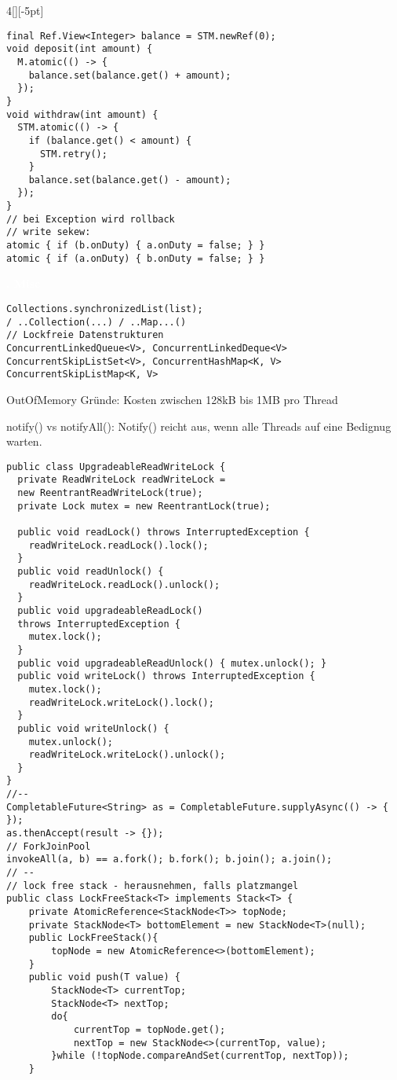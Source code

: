 \documentclass[%
	pdftex,%
	a4paper,%
	landscape,%
	ngerman,
	oneside,%
	6pt,%
	halfparskip,%
]{scrbook}
\newenvironment{mainbox}{%
  \def\FrameCommand{\fboxrule 1px \fcolorbox{black}{spec_blue}}%
  \MakeFramed {\advance\hsize-\width \FrameRestore}}%
 {\endMakeFramed}
\newcommand{\maintopic}[1]{\setcounter{subtopicenum}{0}\setcounter{subsubtopicenum}{0}\vspace{-4px}\begin{mainbox}\textcolor{white}{\textbf{\large{\stepcounter{maintopicenum}\Roman{maintopicenum}. #1}}}\end{mainbox}\vspace{-4px}}
\newenvironment{tight-itemize}
{ \begin{itemize}[leftmargin=*, nosep]
    \setlength{\itemsep}{0px}
    \setlength{\parskip}{0px}
    \setlength{\parsep}{0px}  }
{ \end{itemize}                  }
\begin{document}
\begin{multicols}{4}[][-5pt]
\begin{lstlisting}
final Ref.View<Integer> balance = STM.newRef(0);
void deposit(int amount) {
  M.atomic(() -> {
    balance.set(balance.get() + amount);
  });
}
void withdraw(int amount) {
  STM.atomic(() -> {
    if (balance.get() < amount) {
      STM.retry();
    }
    balance.set(balance.get() - amount);
  });
}
// bei Exception wird rollback
// write sekew:
atomic { if (b.onDuty) { a.onDuty = false; } }
atomic { if (a.onDuty) { b.onDuty = false; } }
\end{lstlisting}

\maintopic{Misc}
\begin{lstlisting}
Collections.synchronizedList(list); 
/ ..Collection(...) / ..Map...()
// Lockfreie Datenstrukturen
ConcurrentLinkedQueue<V>, ConcurrentLinkedDeque<V>
ConcurrentSkipListSet<V>, ConcurrentHashMap<K, V>
ConcurrentSkipListMap<K, V>
\end{lstlisting}

\begin{tight-itemize}
    \item{OutOfMemory Gründe: Kosten zwischen 128kB bis 1MB pro Thread}
    \item{notify() vs notifyAll(): Notify() reicht aus, wenn alle Threads auf eine Bedignug warten.}
\end{tight-itemize}

\begin{lstlisting}
public class UpgradeableReadWriteLock {
  private ReadWriteLock readWriteLock = 
  new ReentrantReadWriteLock(true);
  private Lock mutex = new ReentrantLock(true);

  public void readLock() throws InterruptedException {
    readWriteLock.readLock().lock();
  }
  public void readUnlock() {
    readWriteLock.readLock().unlock();
  }
  public void upgradeableReadLock() 
  throws InterruptedException {
    mutex.lock();
  }
  public void upgradeableReadUnlock() { mutex.unlock(); }
  public void writeLock() throws InterruptedException {
    mutex.lock();
    readWriteLock.writeLock().lock();
  }
  public void writeUnlock() {
    mutex.unlock();
    readWriteLock.writeLock().unlock();
  }
}
//--
CompletableFuture<String> as = CompletableFuture.supplyAsync(() -> {
});
as.thenAccept(result -> {});
// ForkJoinPool
invokeAll(a, b) == a.fork(); b.fork(); b.join(); a.join();
// --
// lock free stack - herausnehmen, falls platzmangel
public class LockFreeStack<T> implements Stack<T> {
    private AtomicReference<StackNode<T>> topNode;
    private StackNode<T> bottomElement = new StackNode<T>(null);
    public LockFreeStack(){
        topNode = new AtomicReference<>(bottomElement);
    }
    public void push(T value) {
        StackNode<T> currentTop;
        StackNode<T> nextTop;
        do{
            currentTop = topNode.get();
            nextTop = new StackNode<>(currentTop, value);
        }while (!topNode.compareAndSet(currentTop, nextTop));
    }


\end{lstlisting}
\end{multicols}
\end{document}
